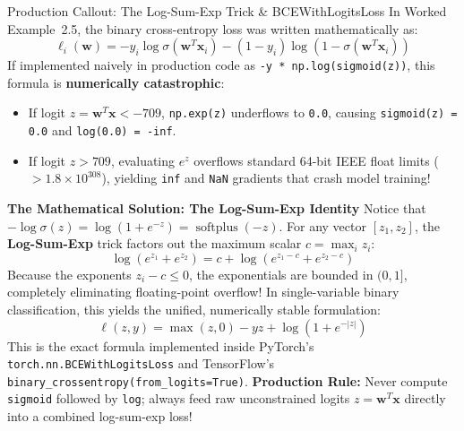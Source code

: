 \begin{formulabox}{Production Callout: The Log-Sum-Exp Trick \& BCEWithLogitsLoss}
In Worked Example~2.5, the binary cross-entropy loss was written mathematically as:
\begin{equation*}
\ell_i(\mathbf{w}) = -y_i \log \sigma(\mathbf{w}^T \mathbf{x}_i) - (1 - y_i) \log(1 - \sigma(\mathbf{w}^T \mathbf{x}_i))
\end{equation*}
If implemented naively in production code as \texttt{-y * np.log(sigmoid(z))}, this formula is \textbf{numerically catastrophic}:
\begin{itemize}
    \item If logit $z = \mathbf{w}^T \mathbf{x} < -709$, \texttt{np.exp(z)} underflows to \texttt{0.0}, causing \texttt{sigmoid(z) = 0.0} and \texttt{log(0.0) = -inf}.
    \item If logit $z > 709$, evaluating $e^z$ overflows standard 64-bit IEEE float limits ($> 1.8 \times 10^{308}$), yielding \texttt{inf} and \texttt{NaN} gradients that crash model training!
\end{itemize}
\textbf{The Mathematical Solution: The Log-Sum-Exp Identity}
Notice that $-\log \sigma(z) = \log(1 + e^{-z}) = \operatorname{softplus}(-z)$. For any vector $[z_1, z_2]$, the \textbf{Log-Sum-Exp} trick factors out the maximum scalar $c = \max_i z_i$:
\begin{equation}
\log(e^{z_1} + e^{z_2}) = c + \log\left(e^{z_1 - c} + e^{z_2 - c}\right)
\label{eq:log_sum_exp_identity}
\end{equation}
Because the exponents $z_i - c \le 0$, the exponentials are bounded in $(0, 1]$, completely eliminating floating-point overflow!
In single-variable binary classification, this yields the unified, numerically stable formulation:
\begin{equation}
\ell(z, y) = \max(z, 0) - y z + \log\left(1 + e^{-|z|}\right)
\label{eq:stable_bce_logits}
\end{equation}
This is the exact formula implemented inside PyTorch's \texttt{torch.nn.BCEWithLogitsLoss} and TensorFlow's \texttt{binary\_crossentropy(from\_logits=True)}. \textbf{Production Rule:} Never compute \texttt{sigmoid} followed by \texttt{log}; always feed raw unconstrained logits $z = \mathbf{w}^T \mathbf{x}$ directly into a combined log-sum-exp loss!
\end{formulabox}


